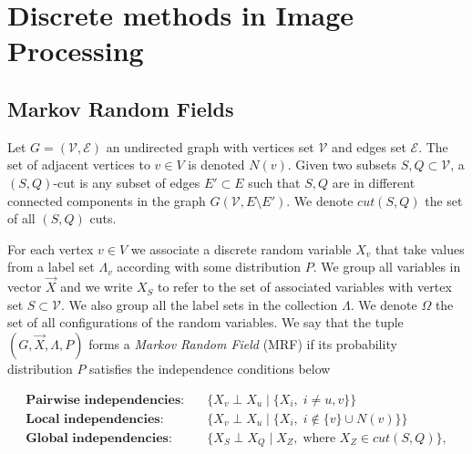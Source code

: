 \chapter{Discrete methods in Image Processing}
\label{chapter:discrete-methods-in-image-processing}

\section{Markov Random Fields}

Let $G=(\mathcal{V},\mathcal{E})$ an undirected graph with vertices set $\mathcal{V}$ and edges set $\mathcal{E}$. The set of adjacent vertices to $v \in V$ is denoted $N(v)$. Given two subsets $S,Q \subset \mathcal{V}$, a $(S,Q)$-cut is any subset of edges $E' \subset E$ such that $S,Q$ are in different connected components in the graph $G(\mathcal{V},E \setminus E')$. We denote $cut(S,Q)$ the set of all $(S,Q)$ cuts.

For each vertex $v \in V$ we associate a discrete random variable $X_v$ that take values from a label set $\Lambda_v$ according with some distribution $P$. We group all variables in vector $\vec{X}$ and we write $X_S$ to refer to the set of associated variables with vertex set $S \subset \mathcal{V}$. We also group all the label sets in the collection $\Lambda$. We denote $\Omega$ the set of all configurations of the random variables. We say that the tuple $(G,\vec{X},\Lambda,P)$ forms a \emph{Markov Random Field} (MRF) if its probability distribution $P$  satisfies the independence conditions below

\begin{align}
	\textbf{Pairwise independencies:}&\quad \Big\{ X_v \perp X_u \;|\; \big\{X_i,\; i \neq u,v \big\}  \Big\} \label{ch2:eq:markov-pairwise-independencies}   \\
	\textbf{Local independencies:}&\quad \Big\{ X_v \perp X_u \;|\; \big\{X_i, \; i \notin \{v\}  \cup N(v)  \big\} \Big\} \label{ch2:eq:markov-local-independencies} \\
	\textbf{Global independencies:}& \quad \Big\{ X_S \perp X_Q \;|\; X_Z,\; \text{where } X_Z \in cut(S,Q) \Big\} \label{ch2:eq:markov-global-independencies},
\end{align}

